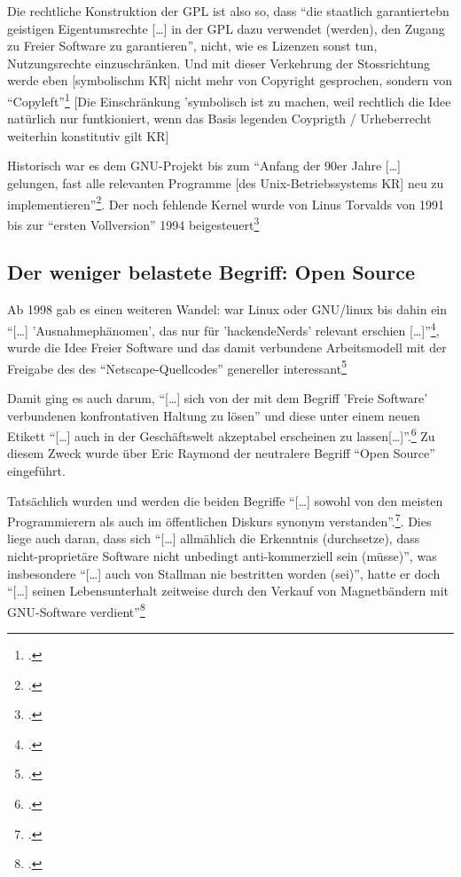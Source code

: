 \documentclass[DIV=calc,BCOR=5mm,11pt,headings=small,oneside,abstract=true, toc=bib]{scrartcl}
\begin{document}
Die rechtliche Konstruktion der GPL ist also so, dass \enquote{die
staatlich garantiertebn geistigen Eigentumsrechte [\ldots] in der GPL
dazu verwendet (werden), den Zugang zu Freier Software zu garantieren},
nicht, wie es Lizenzen sonst tun, Nutzungsrechte einzuschränken. Und mit dieser
Verkehrung der Stossrichtung werde eben [symbolischm KR] nicht mehr von
Copyright gesprochen, sondern von
\enquote{Copyleft}\footcite[vgl.][110]{Eckl2004a} [Die Einschränkung
'symbolisch ist zu machen, weil rechtlich die Idee natürlich nur funtkioniert,
wenn das Basis legenden Coyprigth / Urheberrecht weiterhin konstitutiv gilt KR]

Historisch war es dem GNU-Projekt bis zum \enquote{Anfang der 90er Jahre
[\ldots] gelungen, fast alle relevanten Programme [des
Unix-Betriebssystems KR] neu zu
implementieren}\footcite[vgl.][111]{Eckl2004a}. Der noch fehlende Kernel
wurde von Linus Torvalds von 1991 bis zur \enquote{ersten Vollversion} 1994
beigesteuert\footcite[vgl.][112]{Eckl2004a}

\subsection{Der weniger belastete Begriff: Open Source}

Ab 1998 gab es einen weiteren Wandel: war Linux oder GNU/linux bis dahin ein
\enquote{[\ldots] 'Ausnahmephänomen', das nur für 'hackendeNerds' relevant
erschien [\ldots]}\footcite[vgl.][113]{Eckl2004a}, wurde die Idee Freier
Software und das damit verbundene Arbeitsmodell mit der Freigabe des des
\enquote{Netscape-Quellcodes} genereller
interessant\footcite[vgl.][113]{Eckl2004a}

Damit ging es auch darum, \enquote{[\ldots] sich von der mit dem Begriff
'Freie Software' verbundenen konfrontativen Haltung zu lösen} und diese
unter einem neuen Etikett \enquote{[\ldots] auch in der Geschäftswelt
akzeptabel erscheinen zu lassen[\ldots]}.\footcite[vgl.][114]{Eckl2004a}
Zu diesem Zweck wurde über Eric Raymond der neutralere Begriff
\enquote{Open Source} eingeführt.

Tatsächlich wurden und werden die beiden Begriffe \enquote{[\ldots] sowohl von den
meisten Programmierern als auch im öffentlichen Diskurs synonym
verstanden}.\footcite[vgl.][115]{Eckl2004a}. Dies liege auch daran, dass
sich \enquote{[\ldots] allmählich die Erkenntnis (durchsetze), dass
nicht-proprietäre Software nicht unbedingt anti-kommerziell sein (müsse)},
was insbesondere \enquote{[\ldots] auch von Stallman nie bestritten worden
(sei)}, hatte er doch \enquote{[\ldots] seinen Lebensunterhalt zeitweise
durch den Verkauf von Magnetbändern mit GNU-Software
verdient}\footcite[vgl.][116]{Eckl2004a}
\small

\end{document}

